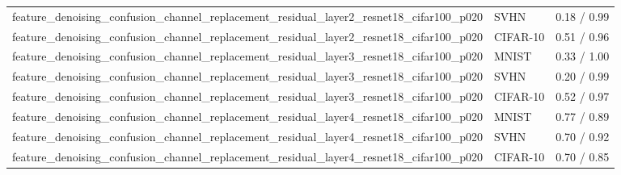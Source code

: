 \begin{tabular}{lll}
feature\_denoising\_confusion\_channel\_replacement\_residual\_layer2\_resnet18\_cifar100\_p020 & SVHN & 0.18 / 0.99 \\
feature\_denoising\_confusion\_channel\_replacement\_residual\_layer2\_resnet18\_cifar100\_p020 & CIFAR-10 & 0.51 / 0.96 \\
feature\_denoising\_confusion\_channel\_replacement\_residual\_layer3\_resnet18\_cifar100\_p020 & MNIST & 0.33 / 1.00 \\
feature\_denoising\_confusion\_channel\_replacement\_residual\_layer3\_resnet18\_cifar100\_p020 & SVHN & 0.20 / 0.99 \\
feature\_denoising\_confusion\_channel\_replacement\_residual\_layer3\_resnet18\_cifar100\_p020 & CIFAR-10 & 0.52 / 0.97 \\
feature\_denoising\_confusion\_channel\_replacement\_residual\_layer4\_resnet18\_cifar100\_p020 & MNIST & 0.77 / 0.89 \\
feature\_denoising\_confusion\_channel\_replacement\_residual\_layer4\_resnet18\_cifar100\_p020 & SVHN & 0.70 / 0.92 \\
feature\_denoising\_confusion\_channel\_replacement\_residual\_layer4\_resnet18\_cifar100\_p020 & CIFAR-10 & 0.70 / 0.85 \\
\bottomrule
\end{tabular}
